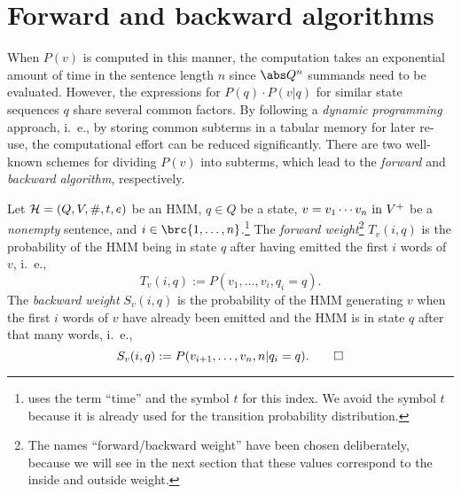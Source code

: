 \section{Forward and backward algorithms}

When $P(v)$ is computed in this manner, the computation takes an exponential
amount of time in the sentence length $n$ since $\abs Q^n$ summands need to be
evaluated. However, the expressions for $P(q)\cdot P(v|q)$ for similar state
sequences $q$ share several common factors. By following a \emph{dynamic
programming} approach, i.~e., by storing common subterms in a tabular memory
for later re-use, the computational effort can be reduced significantly. There
are two well-known schemes for dividing $P(v)$ into subterms, which lead to the
\emph{forward} and \emph{backward algorithm}, respectively.

\begin{definition}
 Let $\mathcal H=(Q,V,\#,t,e)$ be an HMM, $q\in Q$ be a state, $v=v_1\cdots v_n\text{ in } V^+$
 be a \emph{nonempty} sentence, and $i\in\brc{1,\ldots,n}$.\footnote{\cite{jm09} uses
 the term ``time'' and the symbol $t$ for this index. We avoid the symbol $t$
 because it is already used for the transition probability distribution.} The \emph{forward
 weight}\footnote{The names ``forward/backward weight'' have been chosen
 deliberately, because we will see in the next section that these values
 correspond to the inside and outside weight.} $T_v(i,q)$ is the probability
 of the HMM being in state $q$ after having emitted the first $i$ words of
 $v$, i.~e.,
 \[
  T_v(i,q) := P(v_1,\ldots,v_i,q_i=q).
 \]
 The \emph{backward weight} $S_v(i,q)$ is the probability of the HMM
 generating $v$ when the first $i$ words of $v$ have already been emitted and
 the HMM is in state $q$ after that many words, i.~e.,
 \[
  S_v(i,q) := P(v_{i+1},\ldots,v_n,n|q_i=q). \qedhere
 \]
\end{definition}


